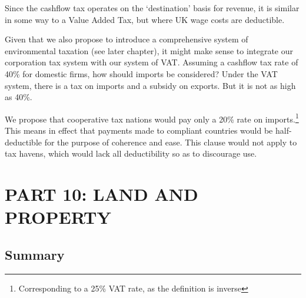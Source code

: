 \documentclass[]{tufte-handout}
\begin{document}
Since the cashflow tax operates on the `destination' basis for revenue,
it is similar in some way to a Value Added Tax, but where UK wage costs
are deductible.

Given that we also propose to introduce a comprehensive system of
environmental taxation (see later chapter), it might make sense to
integrate our corporation tax system with our system of VAT. Assuming a
cashflow tax rate of 40\% for domestic firms, how should imports be
considered? Under the VAT system, there is a tax on imports and a
subsidy on exports. But it is not as high as 40\%.

We propose that cooperative tax nations would pay only a 20\% rate on
imports.\footnote{Corresponding to a 25\% VAT rate, as the definition is
  inverse} This means in effect that payments made to compliant
countries would be half-deductible for the purpose of coherence and
ease. This clause would not apply to tax havens, which would lack all
deductibility so as to discourage use.

\newpage

\hypertarget{part-10-land-and-property}{%
\section{PART 10: LAND AND PROPERTY}\label{part-10-land-and-property}}

\hypertarget{summary-3}{%
\subsection{Summary}\label{summary-3}}
\end{document}
